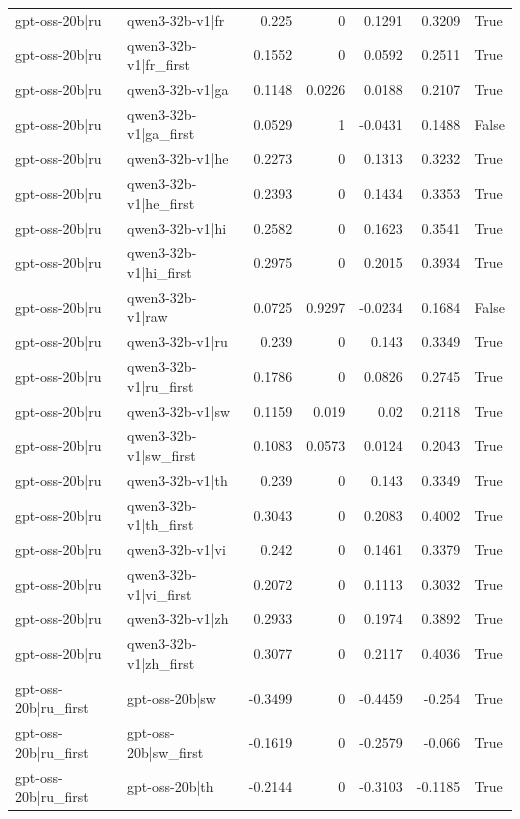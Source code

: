 \begin{table}
\begin{tabular}{l l r r r r l}
gpt-oss-20b|ru & qwen3-32b-v1|fr & 0.225 & 0 & 0.1291 & 0.3209 & True \\
gpt-oss-20b|ru & qwen3-32b-v1|fr_first & 0.1552 & 0 & 0.0592 & 0.2511 & True \\
gpt-oss-20b|ru & qwen3-32b-v1|ga & 0.1148 & 0.0226 & 0.0188 & 0.2107 & True \\
gpt-oss-20b|ru & qwen3-32b-v1|ga_first & 0.0529 & 1 & -0.0431 & 0.1488 & False \\
gpt-oss-20b|ru & qwen3-32b-v1|he & 0.2273 & 0 & 0.1313 & 0.3232 & True \\
gpt-oss-20b|ru & qwen3-32b-v1|he_first & 0.2393 & 0 & 0.1434 & 0.3353 & True \\
gpt-oss-20b|ru & qwen3-32b-v1|hi & 0.2582 & 0 & 0.1623 & 0.3541 & True \\
gpt-oss-20b|ru & qwen3-32b-v1|hi_first & 0.2975 & 0 & 0.2015 & 0.3934 & True \\
gpt-oss-20b|ru & qwen3-32b-v1|raw & 0.0725 & 0.9297 & -0.0234 & 0.1684 & False \\
gpt-oss-20b|ru & qwen3-32b-v1|ru & 0.239 & 0 & 0.143 & 0.3349 & True \\
gpt-oss-20b|ru & qwen3-32b-v1|ru_first & 0.1786 & 0 & 0.0826 & 0.2745 & True \\
gpt-oss-20b|ru & qwen3-32b-v1|sw & 0.1159 & 0.019 & 0.02 & 0.2118 & True \\
gpt-oss-20b|ru & qwen3-32b-v1|sw_first & 0.1083 & 0.0573 & 0.0124 & 0.2043 & True \\
gpt-oss-20b|ru & qwen3-32b-v1|th & 0.239 & 0 & 0.143 & 0.3349 & True \\
gpt-oss-20b|ru & qwen3-32b-v1|th_first & 0.3043 & 0 & 0.2083 & 0.4002 & True \\
gpt-oss-20b|ru & qwen3-32b-v1|vi & 0.242 & 0 & 0.1461 & 0.3379 & True \\
gpt-oss-20b|ru & qwen3-32b-v1|vi_first & 0.2072 & 0 & 0.1113 & 0.3032 & True \\
gpt-oss-20b|ru & qwen3-32b-v1|zh & 0.2933 & 0 & 0.1974 & 0.3892 & True \\
gpt-oss-20b|ru & qwen3-32b-v1|zh_first & 0.3077 & 0 & 0.2117 & 0.4036 & True \\
gpt-oss-20b|ru_first & gpt-oss-20b|sw & -0.3499 & 0 & -0.4459 & -0.254 & True \\
gpt-oss-20b|ru_first & gpt-oss-20b|sw_first & -0.1619 & 0 & -0.2579 & -0.066 & True \\
gpt-oss-20b|ru_first & gpt-oss-20b|th & -0.2144 & 0 & -0.3103 & -0.1185 & True \\

\end{tabular}
\end{table}
